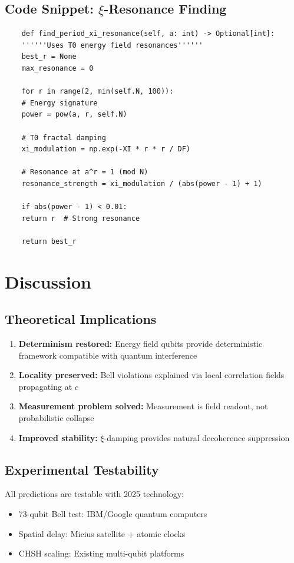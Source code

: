 \subsection{Code Snippet: $\xi$-Resonance Finding}

\begin{lstlisting}
	def find_period_xi_resonance(self, a: int) -> Optional[int]:
	''''''Uses T0 energy field resonances''''''
	best_r = None
	max_resonance = 0
	
	for r in range(2, min(self.N, 100)):
	# Energy signature
	power = pow(a, r, self.N)
	
	# T0 fractal damping
	xi_modulation = np.exp(-XI * r * r / DF)
	
	# Resonance at a^r = 1 (mod N)
	resonance_strength = xi_modulation / (abs(power - 1) + 1)
	
	if abs(power - 1) < 0.01:
	return r  # Strong resonance
	
	return best_r
\end{lstlisting}

\section{Discussion}

\subsection{Theoretical Implications}

\begin{enumerate}
	\item \textbf{Determinism restored:} Energy field qubits provide deterministic framework compatible with quantum interference
	\item \textbf{Locality preserved:} Bell violations explained via local correlation fields propagating at $c$
	\item \textbf{Measurement problem solved:} Measurement is field readout, not probabilistic collapse
	\item \textbf{Improved stability:} $\xi$-damping provides natural decoherence suppression
\end{enumerate}

\subsection{Experimental Testability}

All predictions are testable with 2025 technology:
\begin{itemize}
	\item 73-qubit Bell test: IBM/Google quantum computers
	\item Spatial delay: Micius satellite + atomic clocks
	\item CHSH scaling: Existing multi-qubit platforms
\end{itemize}

